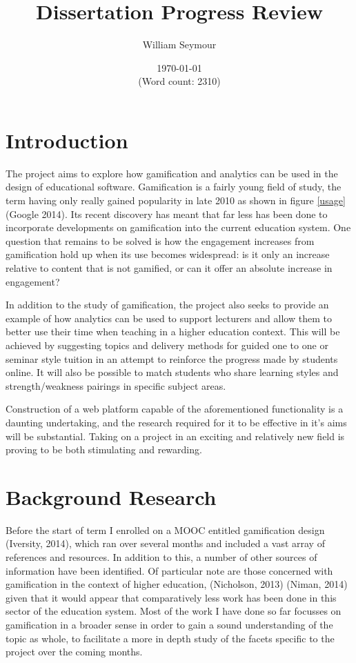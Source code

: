 \documentclass[10pt,a4paper]{report}
\author{William Seymour}
\title{Dissertation Progress Review}
\date{\today \\ (Word count: 2310)}
\begin{document}
\maketitle

\section*{Introduction}
The project aims to explore how gamification and analytics can be used in the design of educational software. Gamification is a fairly young field of study, the term having only really gained popularity in late 2010 as shown in figure \ref{usage} (Google 2014). Its recent discovery has meant that far less has been done to incorporate developments on gamification into the current education system. One question that remains to be solved is how the engagement increases from gamification hold up when its use becomes widespread: is it only an increase relative to content that is not gamified, or can it offer an absolute increase in engagement?

In addition to the study of gamification, the project also seeks to provide an example of how analytics can be used to support lecturers and allow them to better use their time when teaching in a higher education context. This will be achieved by suggesting topics and delivery methods for guided one to one or seminar style tuition in an attempt to reinforce the progress made by students online. It will also be possible to match students who share learning styles and strength/weakness pairings in specific subject areas.

Construction of a web platform capable of the aforementioned functionality is a daunting undertaking, and the research required for it to be effective in it's aims will be substantial. Taking on a project in an exciting and relatively new field is proving to be both stimulating and rewarding.

\section*{Background Research}
Before the start of term I enrolled on a MOOC entitled gamification design (Iversity, 2014), which ran over several months and included a vast array of references and resources. In addition to this, a number of other sources of information have been identified. Of particular note are those concerned with gamification in the context of higher education, (Nicholson, 2013) (Niman, 2014) given that it would appear that comparatively less work has been done in this sector of the education system. Most of the work I have done so far focusses on gamification in a broader sense in order to gain a sound understanding of the topic as whole, to facilitate a more in depth study of the facets specific to the project over the coming months.
\end{document}
